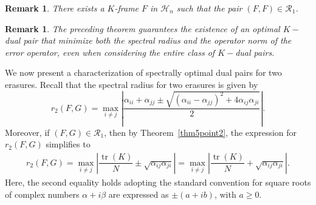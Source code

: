 \documentclass[final,1p,times]{elsarticle}
\newtheorem{rem}[thm]{Remark}
\begin{document}
	
	
	\begin{rem}\label{Thm3point5}
	There exists a $K$-frame \( F \) in \( \mathcal{H}_n \) such that the pair \( (F, F) \in \mathcal{R}_{1} \).
\end{rem}

\begin{rem}
	The preceding theorem guarantees the existence of an optimal $K-$dual pair that minimize both the spectral radius and the operator norm of the error operator, even when considering the entire class of $K-$dual pairs.
\end{rem}

	
	
	
	
	
	
	
	
	
	We now present a characterization of  spectrally optimal dual pairs for two erasures. Recall that the spectral radius for two erasures is given by
\[
r_{2}(F,G) =  \max\limits_{i\neq j} \left| \dfrac{ \alpha_{ii} + \alpha_{jj} \pm \sqrt{( \alpha_{ii} -  \alpha_{jj})^2 + 4  \alpha_{ij}\alpha_{ji} }}{2} \right|.
\]
Moreover, if \( (F,G) \in \mathcal{R}_{1} \), then by Theorem~\ref{thm5point2}, the expression for \( r_{2}(F,G) \) simplifies to
\begin{align}\label{eqn3point4*}
	r_{2}(F,G) = \max_{i\neq j} \left| \dfrac{\operatorname{tr}(K)}{N} \pm \sqrt{\alpha_{ij}\alpha_{ji}} \right| = \max_{i\neq j} \left| \dfrac{\operatorname{tr}(K)}{N} + \sqrt{\alpha_{ij}\alpha_{ji}} \right|.
\end{align}
Here, the second equality holds adopting the standard convention for square roots of complex numbers \( \alpha + i\beta \) are expressed as \( \pm(a + ib) \), with \( a \geq 0 \).
\end{document}

